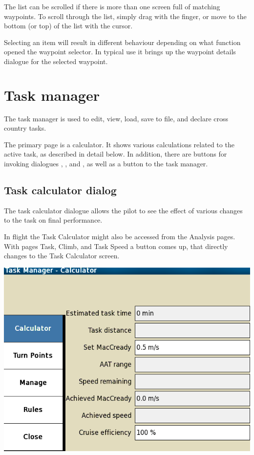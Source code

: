 The list can be scrolled if there is more than one screen full of
matching waypoints.  To scroll through the list, simply drag with the finger, or
move to the bottom (or top) of the list with the cursor.   

Selecting an item will result in different behaviour
depending on what function opened the waypoint selector.  In typical
use it brings up the waypoint details dialogue for the selected
waypoint.

\section{Task manager}\label{sec:task-manager-dialog}

The task manager is used to edit, view, load, save to file, and declare cross
country tasks.

The primary page is a calculator. It shows various calculations 
related to the active task, as described in detail below.  In addition, there 
are buttons for invoking dialogues , , 
and , as well as a button to  the task manager.

\subsection*{Task calculator dialog}\label{sec:task-calc-dial}
The task calculator dialogue allows the pilot to see the effect of
various changes to the task on final performance.

In flight the Task Calculator might also be accessed from the Analysis pages. 
With pages Task, Climb, and Task Speed a button  comes up,
that directly changes to the Task Calculator screen.


\begin{center}
\includegraphics[angle=0,width=0.8\linewidth,keepaspectratio='true']{figures/dialog-taskcalculator.png}
\end{center}

